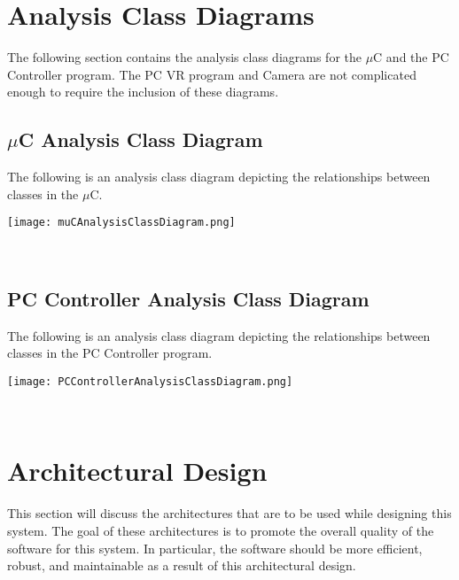 \documentclass[titlepage]{article}
\begin{document}
\section{Analysis Class Diagrams}
The following section contains the analysis class diagrams for the $\mu$C and the PC Controller program. The PC VR program and Camera are not complicated enough to require the inclusion of these diagrams.
\subsection{$\mu$C Analysis Class Diagram}
The following is an analysis class diagram depicting the relationships between classes in the $\mu$C.\\
\begin{center}
	\texttt{[image: muCAnalysisClassDiagram.png]}
\label{fig:muC analysis class diagram}
\end{center}~\\
\newpage
\subsection{PC Controller Analysis Class Diagram}
The following is an analysis class diagram depicting the relationships between classes in the PC Controller program.\\
\begin{center}
	\texttt{[image: PCControllerAnalysisClassDiagram.png]}%
\label{fig:PC controller analysis class diagram}
\end{center}~\\



\section{Architectural Design}
This section will discuss the architectures that are to be used while designing this system. The goal of these architectures is to promote the overall quality of the software for this system. In particular, the software should be more efficient, robust, and maintainable as a result of this architectural design.
\end{document}
